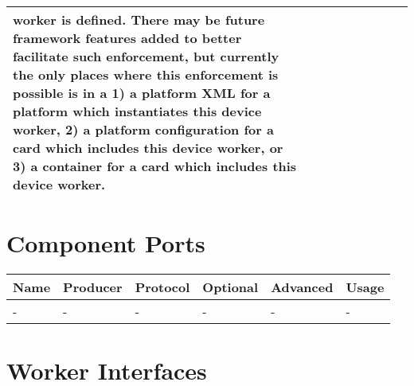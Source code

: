 \documentclass{article}
\begin{document}
\begin{landscape}
\begin{scriptsize}
\begin{longtable}{|p{2cm}|p{2.5cm}|p{1cm}|p{2cm}|p{2cm}|p{1.75cm}|p{2cm}|p{2.25cm}|p{5.04cm}|}
                         worker is defined. There may be future framework
                         features added to better facilitate such enforcement,
                         but currently the only places where this enforcement is
                         possible is in a 1) a platform XML for a platform which
                         instantiates this device worker, 2) a platform
                         configuration for a card which includes this device
                         worker, or 3) a container for a card which includes
                         this device worker.
\\
			\hline
		\end{longtable}
	\end{scriptsize}

	\section*{Component Ports}
	\begin{scriptsize}
		\begin{tabular}{|p{2cm}|p{1.5cm}|p{4cm}|p{1.5cm}|p{1.5cm}|p{10.36cm}|}
			\hline
			\rowcolor{blue}
			Name & Producer & Protocol           & Optional & Advanced & Usage                  \\
			\hline
			-    & -        & -                  & -        & -        & - \\
			\hline
		\end{tabular}
	\end{scriptsize}

	\section*{Worker Interfaces}

\end{landscape}
\end{document}
